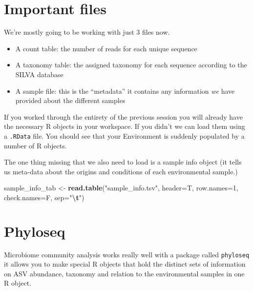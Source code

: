 \documentclass[
]{book}
\newenvironment{Shaded}{\begin{snugshade}}{\end{snugshade}}
\newcommand{\AttributeTok}[1]{\textcolor[rgb]{0.13,0.29,0.53}{#1}}
\newcommand{\DecValTok}[1]{\textcolor[rgb]{0.00,0.00,0.81}{#1}}
\newcommand{\FunctionTok}[1]{\textcolor[rgb]{0.13,0.29,0.53}{\textbf{#1}}}
\newcommand{\NormalTok}[1]{#1}
\newcommand{\OtherTok}[1]{\textcolor[rgb]{0.56,0.35,0.01}{#1}}
\newcommand{\SpecialCharTok}[1]{\textcolor[rgb]{0.81,0.36,0.00}{\textbf{#1}}}
\newcommand{\StringTok}[1]{\textcolor[rgb]{0.31,0.60,0.02}{#1}}
\begin{document}
\hypertarget{important-files}{%
\section{Important files}\label{important-files}}

We're mostly going to be working with just 3 files now.

\begin{itemize}
\item
  A count table: the number of reads for each unique sequence
\item
  A taxonomy table: the assigned taxonomy for each sequence according to the SILVA database
\item
  A sample file: this is the ``metadata'' it contains any information \emph{we} have provided about the different samples
\end{itemize}

If you worked through the entirety of the previous session you will already have the necessary R objects in your workspace. If you didn't we can load them using a \texttt{.RData} file. You should see that your Environment is suddenly populated by a number of R objects.

The one thing missing that we also need to load is a sample info object (it tells us meta-data about the origins and conditions of each environmental sample.)

\begin{Shaded}
\begin{Highlighting}[]
\NormalTok{sample\_info\_tab }\OtherTok{\textless{}{-}} \FunctionTok{read.table}\NormalTok{(}\StringTok{"sample\_info.tsv"}\NormalTok{, }\AttributeTok{header=}\NormalTok{T, }\AttributeTok{row.names=}\DecValTok{1}\NormalTok{,}
                   \AttributeTok{check.names=}\NormalTok{F, }\AttributeTok{sep=}\StringTok{"}\SpecialCharTok{\textbackslash{}t}\StringTok{"}\NormalTok{)}
\end{Highlighting}
\end{Shaded}

\hypertarget{phyloseq}{%
\section{Phyloseq}\label{phyloseq}}

Microbiome community analysis works really well with a package called \texttt{phyloseq} it allows you to make special R objects that hold the distinct sets of information on ASV abundance, taxonomy and relation to the environmental samples in one R object.
\end{document}
